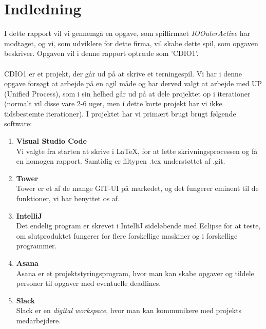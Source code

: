 \chapter{Indledning}
I dette rapport vil vi gennemgå en opgave, som spilfirmaet \textit{IOOuterActive} har modtaget, og vi, som udviklere for dette firma, vil skabe dette spil, som opgaven beskriver.
Opgaven vil i denne rapport optræde som 'CDIO1'.
\\\\CDIO1 er et projekt, der går ud på at skrive et terningespil.
Vi har i denne opgave forsøgt at arbejde på en agil måde og har derved valgt at arbejde med UP (Unified Process), som i sin helhed går ud på at dele projektet op i iterationer (normalt vil disse vare 2-6 uger, men i dette korte projekt har vi ikke tidsbestemte iterationer).
I projektet har vi primært brugt brugt følgende software:
\begin{enumerate}
    \item \textbf{Visual Studio Code}
    \\ Vi valgte fra starten at skrive i LaTeX, for at lette skrivningsprocessen og få en homogen rapport.
    Samtidig er filtypen .tex understøttet af .git.
    \item \textbf{Tower}
    \\Tower er et af de mange GIT-UI på markedet, og det fungerer eminent til de funktioner, vi har benyttet os af.
    \item \textbf{IntelliJ}
    \\Det endelig program er skrevet i IntelliJ sideløbende med Eclipse for at teste, om slutproduktet fungerer for flere forskellige maskiner og i forskellige programmer.
    \item \textbf{Asana}
    \\Asana er et projektstyringsprogram, hvor man kan skabe opgaver og tildele personer til opgaver med eventuelle deadlines.
    \item \textbf{Slack}
    \\Slack er en \textit{digital workspace}, hvor man kan kommunikere med projekts medarbejdere.
\end{enumerate}
